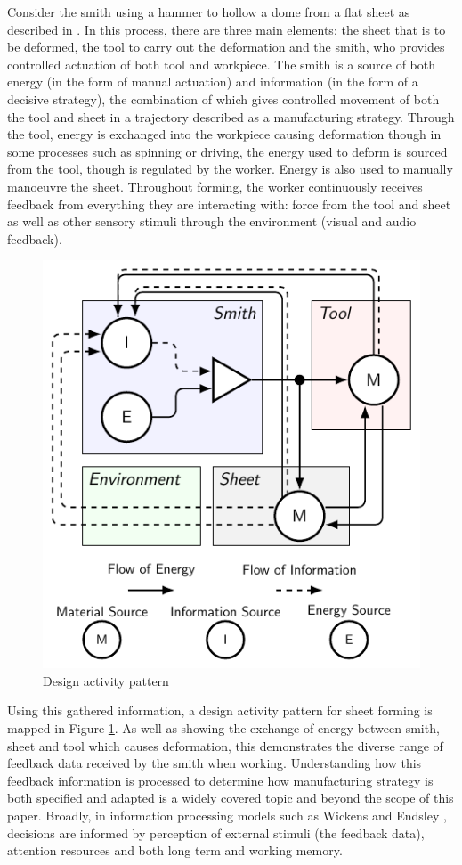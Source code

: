 Consider the smith using a hammer to hollow a dome from a flat sheet as described in \citep{Barr2013ProfessionalFabrication}. In this process, there are three main elements: the sheet that is to be deformed, the tool to carry out the deformation and the smith, who provides controlled actuation of both tool and workpiece. The smith is a source of both energy (in the form of manual actuation) and information (in the form of a decisive strategy), the combination of which gives controlled movement of both the tool and sheet in a trajectory described as a manufacturing strategy. Through the tool, energy is exchanged into the workpiece causing deformation though in some processes such as spinning or driving, the energy used to deform is sourced from the tool, though is regulated by the worker. Energy is also used to manually manoeuvre the sheet. Throughout forming, the worker continuously receives feedback from everything they are interacting with: force from the tool and sheet as well as other sensory stimuli through the environment (visual and audio feedback). 

\begin{figure}[h]
  \centering
  \includegraphics[width=0.5\linewidth]{Diagrams/DAP2.pdf}  
  \caption{Design activity pattern}
  \label{fig:DAP}
\end{figure}

Using this gathered information, a design activity pattern for sheet forming is mapped in Figure \ref{fig:DAP}. As well as showing the exchange of energy between smith, sheet and tool which causes deformation, this demonstrates the diverse range of feedback data received by the smith when working. Understanding how this feedback information is processed to determine how manufacturing strategy is both specified and adapted is a widely covered topic and beyond the scope of this paper. Broadly, in information processing models such as Wickens \citep{Wickens2015EngineeringPerformance} and Endsley \citep{Endsley1995TowardSystems}, decisions are informed by perception of external stimuli (the feedback data), attention resources and both long term and working memory. 


